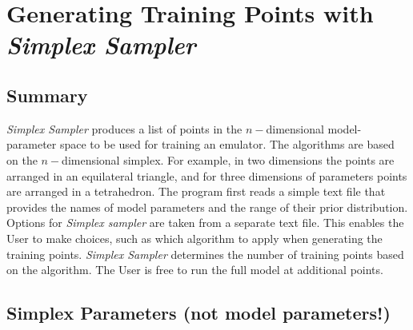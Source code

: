 \documentclass[UserManual.tex]{subfiles}
\begin{document}
\setcounter{section}{2}

\section{Generating Training Points with {\it Simplex Sampler}}\label{sec:simplex}

\subsection{Summary}
{\it Simplex Sampler} produces a list of points in the $n-$dimensional model-parameter space to be used for training an emulator. The algorithms are based on the $n-$dimensional simplex. For example, in two dimensions the points are arranged in an equilateral triangle, and for three dimensions of parameters points are arranged in a tetrahedron. The program first reads a simple text file that provides the names of model parameters and the range of their prior distribution. Options for {\it Simplex sampler} are taken from a separate text file. This enables the User to make choices, such as which algorithm to apply when generating the training points. {\it Simplex Sampler} determines the number of training points based on the algorithm. The User is free to run the full model at additional points.

\subsection{Simplex Parameters (not model parameters!)}
\end{document}
